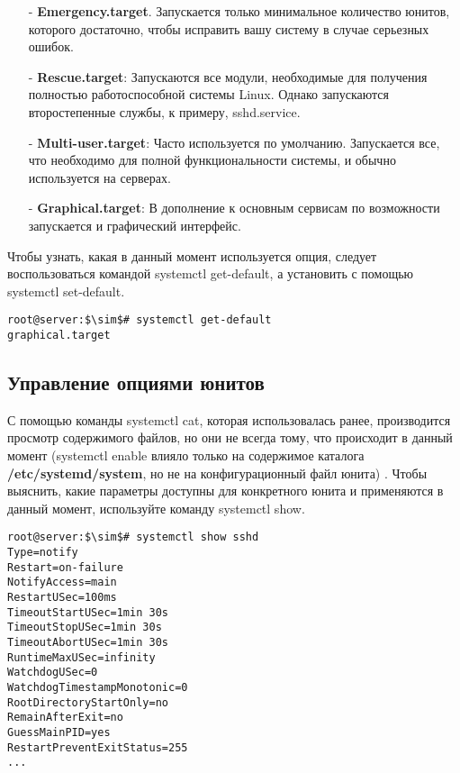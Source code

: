 \documentclass[14pt, a4paper]{article}
\begin{document}
\begin{itemize}
    \item[-] \textbf{Emergency.target}. Запускается только минимальное количество юнитов, которого достаточно,
    чтобы исправить вашу систему в случае серьезных ошибок.
    \item[-] \textbf{Rescue.target}: Запускаются все модули, необходимые для получения полностью
    работоспособной системы Linux. Однако запускаются второстепенные службы, к примеру,
    sshd.service.
    \item[-] \textbf{Multi-user.target}: Часто используется по умолчанию. Запускается все, что необходимо для
    полной функциональности системы, и обычно используется на серверах.
    \item[-] \textbf{Graphical.target}: В дополнение к основным сервисам по возможности запускается и
    графический интерфейс.
\end{itemize}

Чтобы узнать, какая в данный момент используется опция, следует воспользоваться командой
\colorbox{backcolour}{systemctl get-default}, а установить с помощью \colorbox{backcolour}{systemctl set-default}.

\vspace{0.3cm}

\begin{lstlisting}
root@server:$\sim$# systemctl get-default
graphical.target
\end{lstlisting}
\newpage

\subsection*{Управление опциями юнитов} 

С помощью команды \colorbox{backcolour}{systemctl cat}, которая использовалась ранее, производится просмотр
содержимого файлов, но они не всегда тому, что происходит в данный момент (\colorbox{backcolour}{systemctl enable}
влияло только на содержимое каталога \textbf{/etc/systemd/system}, но не на конфигурационный файл
юнита) . Чтобы выяснить, какие параметры доступны для конкретного юнита и применяются в данный
момент, используйте команду \colorbox{backcolour}{systemctl show}.
\vspace{0.3cm}

\begin{lstlisting}
root@server:$\sim$# systemctl show sshd
Type=notify
Restart=on-failure
NotifyAccess=main
RestartUSec=100ms
TimeoutStartUSec=1min 30s
TimeoutStopUSec=1min 30s
TimeoutAbortUSec=1min 30s
RuntimeMaxUSec=infinity
WatchdogUSec=0
WatchdogTimestampMonotonic=0
RootDirectoryStartOnly=no
RemainAfterExit=no
GuessMainPID=yes
RestartPreventExitStatus=255
...
\end{lstlisting}
\end{document}
